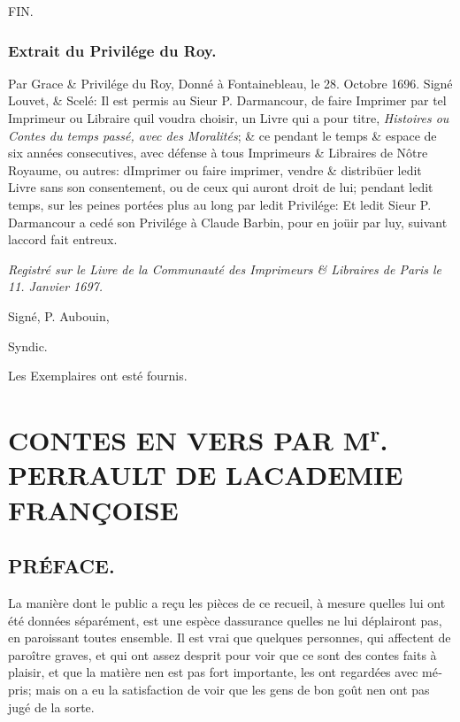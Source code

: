 \documentclass[14pt,a4paper]{memoir}
\begin{document}
\begin{otherlanguage}{french}
FIN.

\newpage
\subsection{Extrait du Privilége du Roy.}

Par Grace \& Privilége du Roy, Donné à Fontainebleau, le 28. Octobre
1696. Signé {Louvet}, \& Scelé: Il est permis au Sieur {P. Darmancour},
de faire Imprimer par tel Imprimeur ou Libraire qu\textquotesingle il
voudra choisir, un Livre qui a pour titre, \emph{Histoires ou Contes du
temps passé, avec des Moralités}; \& ce pendant le temps \& espace de
six années consecutives, avec défense à tous Imprimeurs \& Libraires de
Nôtre Royaume, ou autres: d\textquotesingle Imprimer ou faire imprimer,
vendre \& distribüer ledit Livre sans son consentement, ou de ceux qui
auront droit de lui; pendant ledit temps, sur les peines portées plus au
long par ledit Privilége: Et ledit Sieur P. Darmancour a cedé son
Privilége à Claude Barbin, pour en joüir par luy, suivant
l\textquotesingle accord fait entr\textquotesingle eux.

\emph{Registré sur le Livre de la Communauté des Imprimeurs \& Libraires
de Paris le 11. Janvier 1697.}

Signé, {P. Aubouin},

Syndic.

Les Exemplaires ont esté fournis.


\chapter*{CONTES EN VERS PAR M\textsuperscript{{r}}. PERRAULT DE L\textquotesingle ACADEMIE FRANÇOISE}

\section{PRÉFACE.}
La manière dont le public a reçu les pièces de ce recueil, à mesure
qu\textquotesingle elles lui ont été données séparément, est une espèce
d\textquotesingle assurance qu\textquotesingle elles ne lui déplairont
pas, en paroissant toutes ensemble. Il est vrai que quelques personnes,
qui affectent de paroître graves, et qui ont assez
d\textquotesingle esprit pour voir que ce sont des contes faits à
plaisir, et que la matière n\textquotesingle en est pas fort importante,
les ont regardées avec mépris; mais on a eu la satisfaction de voir que
les gens de bon goût n\textquotesingle en ont pas jugé de la sorte.


\end{otherlanguage}
\end{document}
